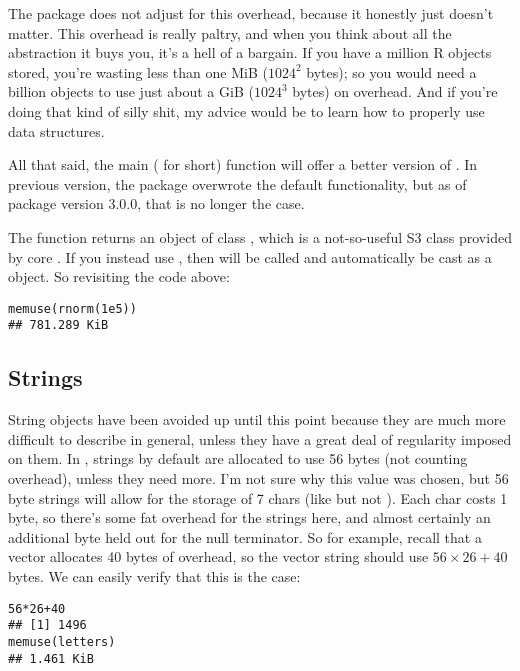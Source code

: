 The  package does not adjust for this overhead, because it 
honestly just doesn't matter.  This overhead is really paltry, and when you 
think about all the abstraction it buys you, it's a hell of a bargain.  If you 
have a million R objects stored, you're wasting less than one MiB ($1024^2$ 
bytes); so you would need a billion objects to use just about a GiB ($1024^3$ 
bytes) on overhead.  And if you're doing that kind of silly shit, my advice 
would be to learn how to properly use data structures.

All that said, the main  ( for short) function
will offer a better version of .  In previous 
version, the package overwrote the default functionality, but as of
package version 3.0.0, that is no longer the case. 

The  function returns an object of class 
, which is a not-so-useful S3 class provided by core 
\R.  If you instead use , then  will
be called and automatically be cast as a  
object.  So revisiting the code above:
\begin{lstlisting}[language=rr]
memuse(rnorm(1e5))
## 781.289 KiB
\end{lstlisting}



\subsection{Strings}

String objects have been avoided up until this point because they are much more 
difficult to describe in general, unless they have a great deal of regularity 
imposed on them.  In \R, strings by default are allocated to use 56 
bytes (not counting overhead), unless they need more.  I'm not sure why this 
value was chosen, but 56 byte strings will allow for the storage of 7 chars 
(like  but not ).  Each char costs 1 byte, so there's some fat 
overhead for the strings here, and almost certainly an additional byte held out 
for the null terminator.  So for example, recall that a vector allocates 40 
bytes of overhead, so the vector string  should use $56\times 26 + 
40$ bytes.  We can easily verify that this is the case:
\begin{lstlisting}[language=rr]
56*26+40
## [1] 1496
memuse(letters)
## 1.461 KiB
\end{lstlisting}

